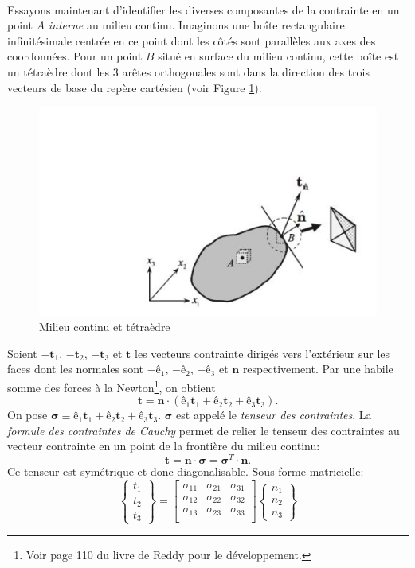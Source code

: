 \paragraph{}
Essayons maintenant d'identifier les diverses composantes de la contrainte en un point $A$ \emph{interne} au milieu continu. Imaginons une boîte rectangulaire infinitésimale centrée en ce point dont les côtés sont parallèles aux axes des coordonnées. Pour un point $B$ situé en surface du milieu continu, cette boîte est un tétraèdre dont les 3 arêtes orthogonales sont dans la direction des trois vecteurs de base du repère cartésien (voir Figure \ref{fig:tetra}).
\begin{figure}[!h]
 \centering
 \includegraphics[scale=0.65]{./patate.jpg}
 \caption{Milieu continu et tétraèdre}
 \label{fig:tetra}
 \end{figure}
  Soient $-\textbf{t}_1$, $-\textbf{t}_2$, $-\textbf{t}_3$ et $ \textbf{t}$ les vecteurs contrainte dirigés vers l'extérieur sur les faces dont les normales sont $-\textbf{ê}_1$,  $-\textbf{ê}_2$, $-\textbf{ê}_3$ et $\textbf{\^n}$ respectivement. Par une habile somme des forces à la Newton\footnote{Voir page 110 du livre de Reddy pour le développement.}, on obtient $$\textbf{t}=\textbf{\^n}\cdot(\textbf{ê}_1\textbf{t}_1+\textbf{ê}_2\textbf{t}_2+\textbf{ê}_3\textbf{t}_3).$$
On pose $\boldsymbol{\sigma}\equiv\textbf{ê}_1\textbf{t}_1+\textbf{ê}_2\textbf{t}_2+\textbf{ê}_3\textbf{t}_3$. $\boldsymbol{\sigma}$ est appelé le \emph{tenseur des contraintes}. La \emph{formule des contraintes de Cauchy} permet de relier le tenseur des contraintes au vecteur contrainte en un point de la frontière du milieu continu:
$$\textbf{t}=\textbf{\^n}\cdot\boldsymbol{\sigma}=\boldsymbol{\sigma}^T\cdot\textbf{\^n}.$$
Ce tenseur est symétrique et donc diagonalisable. Sous forme matricielle:
$$\left\{\begin{array}{c}
t_1\\
t_2\\
t_3
\end{array}\right\}
=\left[
\begin{array}{ccc}
\sigma_{11}&\sigma_{21}&\sigma_{31}\\
\sigma_{12}&\sigma_{22}&\sigma_{32}\\
\sigma_{13}&\sigma_{23}&\sigma_{33}\\
\end{array} \right]
\left\{\begin{array}{c}
n_1\\
n_2\\
n_3
\end{array}\right\}$$
